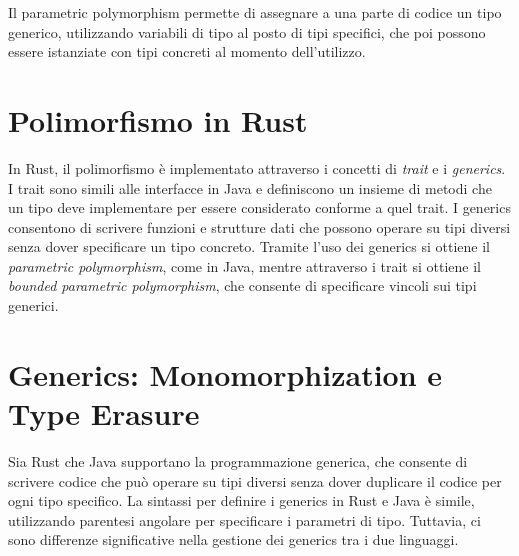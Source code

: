 Il parametric polymorphism permette di assegnare a una parte di codice un tipo generico, utilizzando variabili di tipo al posto di tipi specifici, che poi possono essere istanziate con tipi concreti al momento dell'utilizzo.
\section{Polimorfismo in Rust}
In Rust, il polimorfismo è implementato attraverso i concetti di \textit{trait} e i \textit{generics}. I trait sono simili alle interfacce in Java e definiscono un insieme di metodi che un tipo deve implementare per essere considerato conforme a quel trait. I generics consentono di scrivere funzioni e strutture dati che possono operare su tipi diversi senza dover specificare un tipo concreto. Tramite l'uso dei generics si ottiene il \textit{parametric polymorphism}, come in Java, mentre attraverso i trait si ottiene il \textit{bounded parametric polymorphism}, che consente di specificare vincoli sui tipi generici.
\section{Generics: Monomorphization e Type Erasure}
\label{sec:generics}
Sia Rust che Java supportano la programmazione generica, che consente di scrivere codice che può operare su tipi diversi senza dover duplicare il codice per ogni tipo specifico. La sintassi per definire i generics in Rust e Java è simile, utilizzando parentesi angolare per specificare i parametri di tipo. Tuttavia, ci sono differenze significative nella gestione dei generics tra i due linguaggi.

